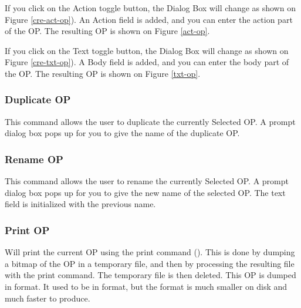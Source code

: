 

If you click on the Action toggle button, the Dialog Box will change as shown
on Figure \ref{cre-act-op}). An Action field is added, and you can enter the
action part of the OP. The resulting OP is shown on Figure \ref{act-op}.



If you click on the Text toggle button, the Dialog Box will change as shown
on Figure \ref{cre-txt-op}). A Body field is added, and you can enter the
body part of the OP. The resulting OP is shown on Figure \ref{txt-op}.

\subsubsection{Duplicate OP}

This command allows the user to duplicate the currently Selected OP. A
prompt dialog box pops up for you to give the name of the duplicate
OP.

\subsubsection{Rename OP}

This command allows the user to rename the currently Selected OP. A
prompt dialog box pops up for you to give the new name of the selected
OP. The text field is initialized with the previous name.

\subsubsection{Print OP}

Will print the current OP using the print command (). This is done by dumping a bitmap of the OP in a temporary file, and
then by processing the resulting file with the print command. The temporary
file is then deleted. This OP is dumped in  format. It used to be in
 format, but the  format is much smaller on disk and
much faster
to produce.

